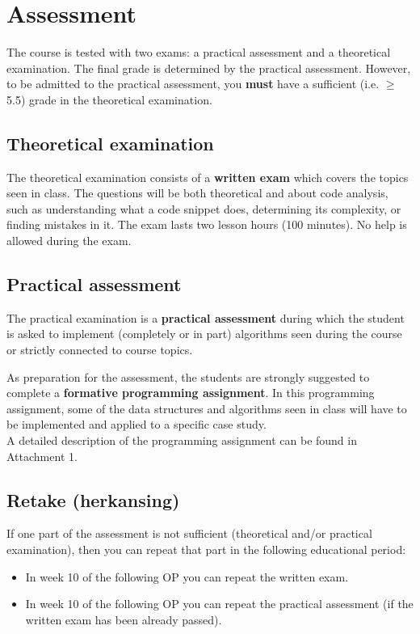 \section{Assessment}
	The course is tested with two exams: a practical assessment and a theoretical examination. The final grade is determined by the practical assessment. However, to be admitted to the practical assessment, you \textbf{must} have a sufficient (i.e. $\geq$ 5.5) grade in the theoretical examination.

	\subsection{Theoretical examination}
	The theoretical examination consists of a \textbf{written exam} which covers the topics seen in class. The questions will be both theoretical and about code analysis, such as understanding what a code snippet does, determining its complexity, or finding mistakes in it.
	The exam lasts two lesson hours (100 minutes). No help is allowed during the exam.\\

	\subsection{Practical assessment}
	The practical examination is a \textbf{practical assessment} during which the student is asked to implement (completely or in part) algorithms seen during the course or strictly connected to course topics. 
	
	As preparation for the assessment, the students are strongly suggested to complete a \textbf{formative programming assignment}. In this programming assignment, some of the data structures and algorithms seen in class will have to be implemented and applied to a specific case study.\\ 
	A detailed description of the programming assignment can be found in Attachment 1.
	
	\subsection{Retake (herkansing)}
	If one part of the assessment is not sufficient (theoretical and/or practical examination), then you can repeat that part in the following educational period:
	\begin{itemize}
	\item In week 10 of the following OP you can repeat the written exam.
	\item In week 10 of the following OP you can repeat the practical assessment (if the written exam has been already passed).
	\end{itemize}
	
